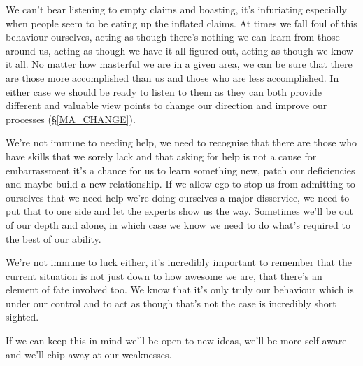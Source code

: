 \cleartorightpage
\begin{multicols}{2}

We can't bear listening to empty claims and boasting, it's infuriating especially when people seem to be eating up the inflated claims. At times we fall foul of this behaviour ourselves, acting as though there's nothing we can learn from those around us, acting as though we have it all figured out, acting as though we know it all. No matter how masterful we are in a given area, we can be sure that there are those more accomplished than us and those who are less accomplished. In either case we should be ready to listen to them as they can both provide different and valuable view points to change our direction and improve our processes (\S \ref{MA_CHANGE}).

We're not immune to needing help, we need to recognise that there are those who have skills that we sorely lack and that asking for help is not a cause for embarrassment it's a chance for us to learn something new, patch our deficiencies and maybe build a new relationship. If we allow ego to stop us from admitting to ourselves that we need help we're doing ourselves a major disservice, we need to put that to one side and let the experts show us the way. Sometimes we'll be out of our depth and alone, in which case we know we need to do what's required to the best of our ability.

We're not immune to luck either, it's incredibly important to remember that the current situation is not just down to how awesome we are, that there's an element of fate involved too. We know that it's only truly our behaviour which is under our control and to act as though that's not the case is incredibly short sighted.

If we can keep this in mind we'll be open to new ideas, we'll be more self aware and we'll chip away at our weaknesses.

\end{multicols}
\cleartoleftpage
